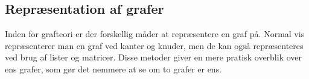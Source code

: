 \subsection{Repræsentation af grafer}
Inden for grafteori er der forskellig måder at repræsentere en graf på. Normal vis repræsenterer man en graf ved kanter og knuder, men de kan også repræsenteres ved brug af lister og matricer. Disse metoder giver en mere pratisk overblik over ens grafer, som gør det nemmere at se om to grafer er ens.
